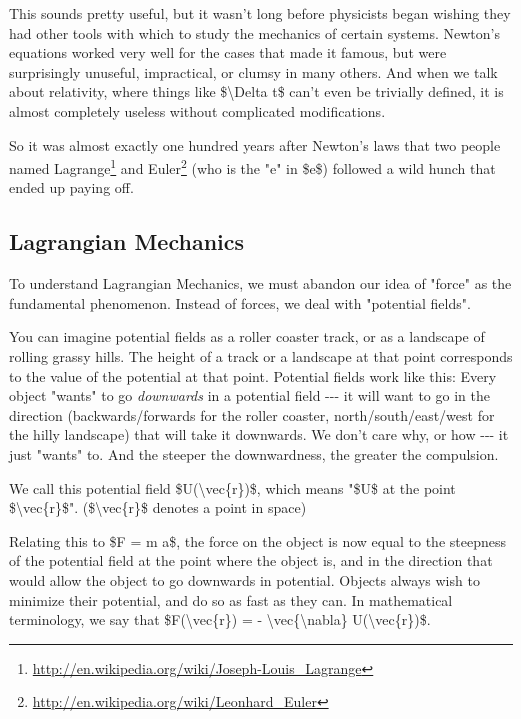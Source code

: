 \documentclass[]{article}
\renewcommand{\href}[2]{#2\footnote{\url{#1}}}
\begin{document}
This sounds pretty useful, but it wasn't long before physicists began wishing
they had other tools with which to study the mechanics of certain systems.
Newton's equations worked very well for the cases that made it famous, but were
surprisingly unuseful, impractical, or clumsy in many others. And when we talk
about relativity, where things like \$\textbackslash{}Delta t\$ can't even be
trivially defined, it is almost completely useless without complicated
modifications.

So it was almost exactly one hundred years after Newton's laws that two people
named \href{http://en.wikipedia.org/wiki/Joseph-Louis_Lagrange}{Lagrange} and
\href{http://en.wikipedia.org/wiki/Leonhard_Euler}{Euler} (who is the "e" in
\$e\$) followed a wild hunch that ended up paying off.

\subsection{Lagrangian Mechanics}

To understand Lagrangian Mechanics, we must abandon our idea of "force" as the
fundamental phenomenon. Instead of forces, we deal with "potential fields".

You can imagine potential fields as a roller coaster track, or as a landscape of
rolling grassy hills. The height of a track or a landscape at that point
corresponds to the value of the potential at that point. Potential fields work
like this: Every object "wants" to go \emph{downwards} in a potential field
-\/-\/- it will want to go in the direction (backwards/forwards for the roller
coaster, north/south/east/west for the hilly landscape) that will take it
downwards. We don't care why, or how -\/-\/- it just "wants" to. And the steeper
the downwardness, the greater the compulsion.

We call this potential field \$U(\textbackslash{}vec\{r\})\$, which means "\$U\$
at the point \$\textbackslash{}vec\{r\}\$". (\$\textbackslash{}vec\{r\}\$
denotes a point in space)

Relating this to \$F = m a\$, the force on the object is now equal to the
steepness of the potential field at the point where the object is, and in the
direction that would allow the object to go downwards in potential. Objects
always wish to minimize their potential, and do so as fast as they can. In
mathematical terminology, we say that \$F(\textbackslash{}vec\{r\}) = -
\textbackslash{}vec\{\textbackslash{}nabla\} U(\textbackslash{}vec\{r\})\$.
\end{document}
